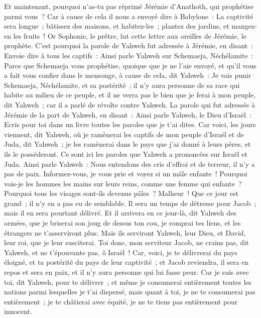 \begin{multicols}{2}
Et maintenant, pourquoi n'as-tu pas réprimé Jérémie d'Anathoth, qui prophétise parmi vous~?
Car à cause de cela il nous a envoyé dire à Babylone~: La captivité sera longue~; bâtissez des maisons, et habitez-les~; plantez des jardins, et mangez-en les fruits~!
Or Sophonie, le prêtre, lut cette lettre aux oreilles de Jérémie, le prophète.
C'est pourquoi la parole de Yahweh fut adressée à Jérémie, en disant~:
Envoie dire à tous les captifs~: Ainsi parle Yahweh sur Schemaeja, Néchélamite~: Parce que Schemaeja vous prophétise, quoique que je ne l'aie envoyé, et qu'il vous a fait vous confier dans le mensonge,
à cause de cela, dit Yahweh~: Je vais punir Schemaeja, Néchélamite, et sa postérité~; il n'y aura personne de sa race qui habite au milieu de ce peuple, et il ne verra pas le bien que je ferai à mon peuple, dit Yahweh~; car il a parlé de révolte contre Yahweh.
\VerseOne{}La parole qui fut adressée à Jérémie de la part de Yahweh, en disant~:
Ainsi parle Yahweh, le Dieu d'Israël~: Ecris pour toi dans un livre toutes les paroles que je t'ai dites.
Car voici, les jours viennent, dit Yahweh, où je ramènerai les captifs de mon peuple d'Israël et de Juda, dit Yahweh~; je les ramènerai dans le pays que j'ai donné à leurs pères, et ils le posséderont.
Ce sont ici les paroles que Yahweh a prononcées sur Israël et Juda.
Ainsi parle Yahweh~: Nous entendons des cris d'effroi et de terreur, il n'y a pas de paix.
Informez-vous, je vous prie et voyez si un mâle enfante~! Pourquoi vois-je les hommes les mains sur leurs reins, comme une femme qui enfante~? Pourquoi tous les visages sont-ils devenus pâles~?
Malheur~! Que ce jour est grand~; il n'y en a pas eu de semblable. Il sera un temps de détresse pour Jacob~; mais il en sera pourtant délivré.
Et il arrivera en ce jour-là, dit Yahweh des armées, que je briserai son joug de dessus ton cou, je romprai tes liens, et les étrangers ne t'asserviront plus.
Mais ils serviront Yahweh, leur Dieu, et David, leur roi, que je leur susciterai.
Toi donc, mon serviteur Jacob, ne crains pas, dit Yahweh, et ne t'épouvante pas, ô Israël~! Car, voici, je te délivrerai du pays éloigné, et ta postérité du pays de leur captivité~; et Jacob reviendra, il sera en repos et sera en paix, et il n'y aura personne qui lui fasse peur.
Car je suis avec toi, dit Yahweh, pour te délivrer~; et même je consumerai entièrement toutes les nations parmi lesquelles je t'ai dispersé, mais quant à toi, je ne te consumerai pas entièrement~; je te châtierai avec équité, je ne te tiens pas entièrement pour innocent.

\end{multicols}
